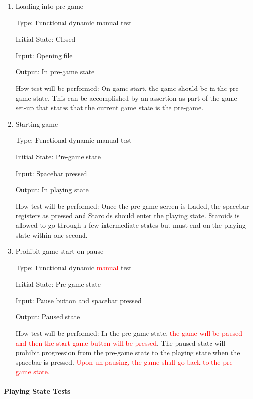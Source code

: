 \documentclass[12pt, titlepage]{article}
\begin{document}
\begin{enumerate}

\item{Loading into pre-game\\}

Type: Functional dynamic manual test

Initial State: Closed

Input: Opening file

Output: In pre-game state

How test will be performed: On game start, the game should be in the pre-game state. This can be accomplished by an assertion as part of the game set-up that states that the current game state is the pre-game.

\item{Starting game\\}

Type: Functional dynamic manual test

Initial State: Pre-game state

Input: Spacebar pressed

Output: In playing state

How test will be performed: Once the pre-game screen is loaded, the spacebar registers as pressed and Staroids should enter the playing state. Staroids is allowed to go through a few intermediate states but must end on the playing state within one second.

\item{Prohibit game start on pause\\}

Type: Functional dynamic \textcolor{red}{manual} test

Initial State: Pre-game state

Input: Pause button and spacebar pressed

Output: Paused state

How test will be performed: In the pre-game state, \textcolor{red}{the game will be paused and then the start game button will be pressed}. The paused state will prohibit progression from the pre-game state to the playing state when the spacebar is pressed. \textcolor{red}{Upon un-pausing, the game shall go back to the pre-game state.}

\end{enumerate}

\paragraph{Playing State Tests}
\end{document}
